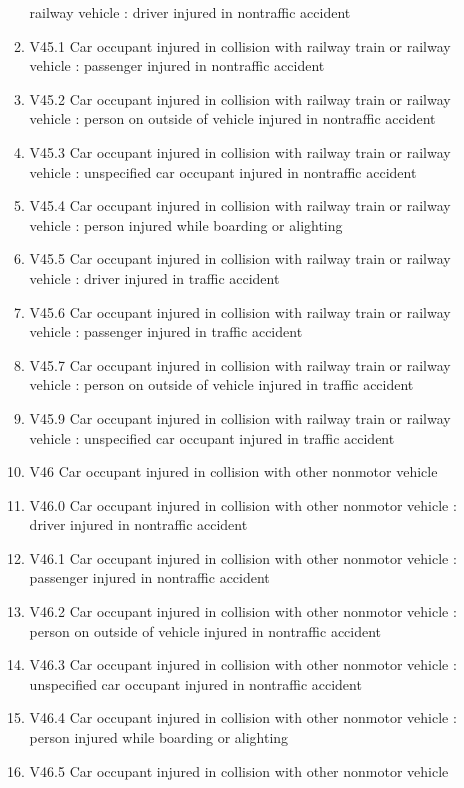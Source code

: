 \documentclass[
]{scrartcl}
\begin{document}
\begin{itemize}
\begin{enumerate}
    railway vehicle : driver injured in nontraffic accident
  \item
    V45.1 Car occupant injured in collision with railway train or
    railway vehicle : passenger injured in nontraffic accident
  \item
    V45.2 Car occupant injured in collision with railway train or
    railway vehicle : person on outside of vehicle injured in nontraffic
    accident
  \item
    V45.3 Car occupant injured in collision with railway train or
    railway vehicle : unspecified car occupant injured in nontraffic
    accident
  \item
    V45.4 Car occupant injured in collision with railway train or
    railway vehicle : person injured while boarding or alighting
  \item
    V45.5 Car occupant injured in collision with railway train or
    railway vehicle : driver injured in traffic accident
  \item
    V45.6 Car occupant injured in collision with railway train or
    railway vehicle : passenger injured in traffic accident
  \item
    V45.7 Car occupant injured in collision with railway train or
    railway vehicle : person on outside of vehicle injured in traffic
    accident
  \item
    V45.9 Car occupant injured in collision with railway train or
    railway vehicle : unspecified car occupant injured in traffic
    accident
  \item
    V46 Car occupant injured in collision with other nonmotor vehicle
  \item
    V46.0 Car occupant injured in collision with other nonmotor vehicle
    : driver injured in nontraffic accident
  \item
    V46.1 Car occupant injured in collision with other nonmotor vehicle
    : passenger injured in nontraffic accident
  \item
    V46.2 Car occupant injured in collision with other nonmotor vehicle
    : person on outside of vehicle injured in nontraffic accident
  \item
    V46.3 Car occupant injured in collision with other nonmotor vehicle
    : unspecified car occupant injured in nontraffic accident
  \item
    V46.4 Car occupant injured in collision with other nonmotor vehicle
    : person injured while boarding or alighting
  \item
    V46.5 Car occupant injured in collision with other nonmotor vehicle

\end{enumerate}
\end{itemize}
\end{document}
